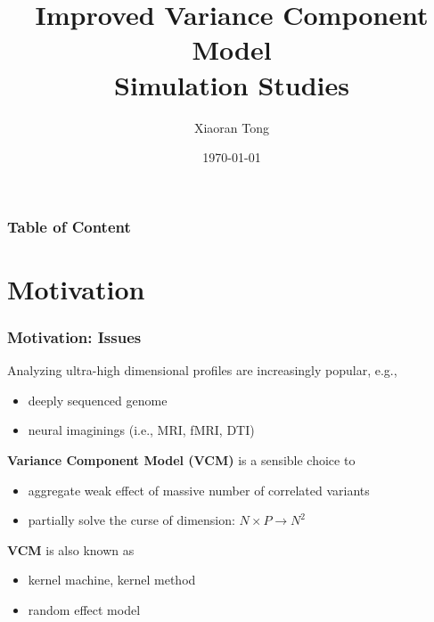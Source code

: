 \documentclass{beamer}
\title[Fast-VCM]{Improved Variance Component Model \\ Simulation Studies}
\author{Xiaoran Tong} %
\institute[EPI Biosta,
MSU] %
{ Michigan State University \\ %
  \medskip \textit{tongxia1@msu.edu} \\%
  \textit{qlu@epi.msu.edu} %
} \date{\today} %
\begin{document}
\begin{frame}
  \titlepage %
\end{frame}

\begin{frame}
  \frametitle{Table of
    Content} %
  \tableofcontents
\end{frame}
\section{Motivation}
\begin{frame}\frametitle{Motivation: Issues}
  Analyzing ultra-high dimensional profiles are increasingly popular,
  e.g.,
  \begin{itemize}
  \item deeply sequenced genome
  \item neural imaginings (i.e., MRI, fMRI, DTI)
  \end{itemize}
  \textbf{Variance Component Model (VCM)} is a sensible choice to
  \begin{itemize}
  \item aggregate weak effect of massive number of correlated variants
  \item partially solve the curse of dimension: $N \times P \to N^2$
  \end{itemize}
  \textbf{VCM} is also known as
  \begin{itemize}
  \item kernel machine, kernel method
  \item random effect model
  \end{itemize}
\end{frame}
\newcommand{\fit}[1]{{\color{magenta}{#1}}}
\newcommand{\CB}[1]{{\color{blue}{#1}}}
\newcommand{\CR}[1]{{\color{red}{#1}}}
\newcommand{\green}[1]{{\color{green}{#1}}}
\end{document}
